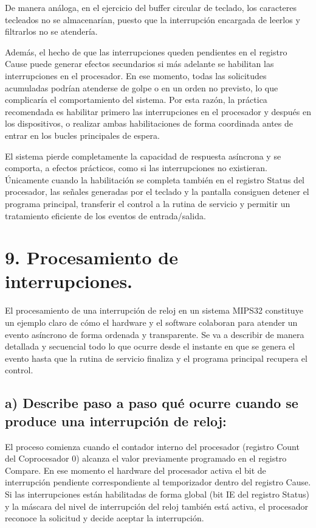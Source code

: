 \documentclass[12pt, letterpaper]{article}
\begin{document}
De manera análoga, en el ejercicio del buffer circular de teclado, los caracteres tecleados no se almacenarían, puesto que la interrupción encargada de leerlos y filtrarlos no se atendería.

Además, el hecho de que las interrupciones queden pendientes en el registro Cause puede generar efectos secundarios si más adelante se habilitan las interrupciones en el procesador. En ese momento, todas las solicitudes acumuladas podrían atenderse de golpe o en un orden no previsto, lo que complicaría el comportamiento del sistema.
Por esta razón, la práctica recomendada es habilitar primero las interrupciones en el procesador y después en los dispositivos, o realizar ambas habilitaciones de forma coordinada antes de entrar en los bucles principales de espera.

El sistema pierde completamente la capacidad de respuesta asíncrona y se comporta, a efectos prácticos, como si las interrupciones no existieran. Únicamente cuando la habilitación se completa también en el registro Status del procesador, las señales generadas por el teclado y la pantalla consiguen detener el programa principal, transferir el control a la rutina de servicio y permitir un tratamiento eficiente de los eventos de entrada/salida.\newpage

\section*{9. Procesamiento de interrupciones.}

El procesamiento de una interrupción de reloj en un sistema MIPS32 constituye un ejemplo claro de cómo el hardware y el software colaboran para atender un evento asíncrono de forma ordenada y transparente. Se va a describir de manera detallada y secuencial todo lo que ocurre desde el instante en que se genera el evento hasta que la rutina de servicio finaliza y el programa principal recupera el control.

\subsection*{a) Describe paso a paso qué ocurre cuando se produce una interrupción de reloj:}

El proceso comienza cuando el contador interno del procesador (registro Count del Coprocesador 0) alcanza el valor previamente programado en el registro Compare. En ese momento el hardware del procesador activa el bit de interrupción pendiente correspondiente al temporizador dentro del registro Cause. Si las interrupciones están habilitadas de forma global (bit IE del registro Status) y la máscara del nivel de interrupción del reloj también está activa, el procesador reconoce la solicitud y decide aceptar la interrupción.
\end{document}
